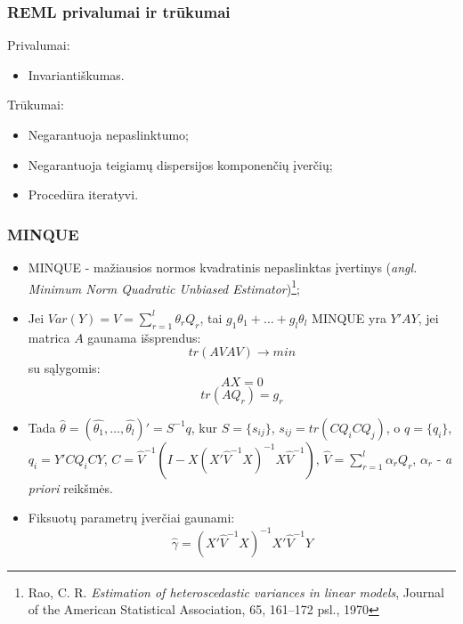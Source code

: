\documentclass[utf8,hyperref={unicode,pdftex}]{beamer}
\begin{document}
\begin{frame}
\frametitle{REML privalumai ir trūkumai}
Privalumai:
\begin{itemize}
\item Invariantiškumas.
\end{itemize}
Trūkumai:
\begin{itemize}
\item Negarantuoja nepaslinktumo;
\item Negarantuoja teigiamų dispersijos komponenčių įverčių;
\item Procedūra iteratyvi.
\end{itemize}
\end{frame}
\begin{frame}
\frametitle{MINQUE}
\begin{small}
\begin{itemize}
\item \indent MINQUE - mažiausios normos kvadratinis nepaslinktas įvertinys (\textit{angl. Minimum Norm Quadratic Unbiased Estimator})\footnote{Rao, C. R.  \textit{Estimation of heteroscedastic variances in linear models}, Journal of the American Statistical Association, 65, 161–172 psl., 1970};\\
 

\item \indent Jei $Var(Y)=V= \sum^l_{r=1}\theta_r Q_r$, tai $g_1 \theta_1+\dots+g_l \theta_l$ MINQUE yra $Y'AY$, jei matrica $A$ gaunama išsprendus:
\[tr(AVAV) \to min\]
su sąlygomis:
\[AX = 0\]
\[tr(AQ_r)=g_r\]
\item Tada $\hat{\theta} = (\hat{\theta_1},\dots,\hat{\theta_l})'=S^{-1}q$, kur $S=\{s_{ij}\}$, $s_{ij}=tr(CQ_iCQ_j)$, o
$q=\{q_i\}$, $q_i=Y'CQ_iCY$, $C = \hat{V}^{-1}(I-X(X' \hat{V}^{-1}X)^{-1}X \hat{V}^{-1})$, $\hat{V}=\sum^l_{r=1}\alpha_rQ_r$, $\alpha_r$ - \textit{a priori} reikšmės.

\item Fiksuotų parametrų įverčiai gaunami:
\[\hat{\gamma}=(X'\hat{V}^{-1}X)^{-1}X'\hat{V}^{-1}Y\]
\end{itemize}
\end{small}
\end{frame}
\end{document}
